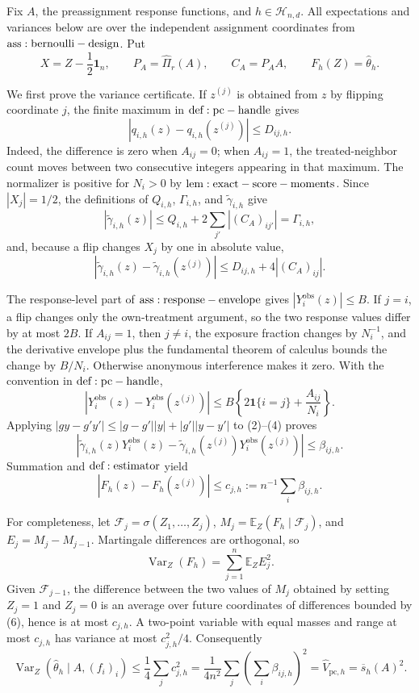 Fix \(A\), the preassignment response functions, and \(h\in\mathcal H_{n,d}\).  All expectations and variances below are over the independent assignment coordinates from \({\rm ass:bernoulli-design}\).  Put
\[
 X=Z-\frac12\mathbf1_n,\qquad P_A=\widehat\Pi_r(A),\qquad C_A=P_AA,
 \qquad F_h(Z)=\widehat\theta_h.
\]

We first prove the variance certificate.  If \(z^{(j)}\) is obtained from \(z\) by flipping coordinate \(j\), the finite maximum in \({\rm def:pc-handle}\) gives
\[
 |q_{i,h}(z)-q_{i,h}(z^{(j)})|\leq D_{ij,h}.
\tag{1}
\]
Indeed, the difference is zero when \(A_{ij}=0\); when \(A_{ij}=1\), the treated-neighbor count moves between two consecutive integers appearing in that maximum.  The normalizer is positive for \(N_i>0\) by \({\rm lem:exact-score-moments}\).  Since \(|X_j|=1/2\), the definitions of \(Q_{i,h}\), \(\Gamma_{i,h}\), and \(\widetilde\gamma_{i,h}\) give
\[
 |\widetilde\gamma_{i,h}(z)|\leq Q_{i,h}+2\sum_{j'}|(C_A)_{ij'}|=\Gamma_{i,h},
\tag{2}
\]
and, because a flip changes \(X_j\) by one in absolute value,
\[
 |\widetilde\gamma_{i,h}(z)-\widetilde\gamma_{i,h}(z^{(j)})|
 \leq D_{ij,h}+4|(C_A)_{ij}|.
\tag{3}
\]

The response-level part of \({\rm ass:response-envelope}\) gives \(|Y_i^{\mathrm{obs}}(z)|\leq B\).  If \(j=i\), a flip changes only the own-treatment argument, so the two response values differ by at most \(2B\).  If \(A_{ij}=1\), then \(j\ne i\), the exposure fraction changes by \(N_i^{-1}\), and the derivative envelope plus the fundamental theorem of calculus bounds the change by \(B/N_i\).  Otherwise anonymous interference makes it zero.  With the convention in \({\rm def:pc-handle}\),
\[
 |Y_i^{\mathrm{obs}}(z)-Y_i^{\mathrm{obs}}(z^{(j)})|
 \leq B\left\{2\mathbf1\{i=j\}+\frac{A_{ij}}{N_i}\right\}.
\tag{4}
\]
Applying \(|gy-g'y'|\leq|g-g'||y|+|g'||y-y'|\) to (2)--(4) proves
\[
 |\widetilde\gamma_{i,h}(z)Y_i^{\mathrm{obs}}(z)
 -\widetilde\gamma_{i,h}(z^{(j)})Y_i^{\mathrm{obs}}(z^{(j)})|
 \leq\beta_{ij,h}.
\tag{5}
\]
Summation and \({\rm def:estimator}\) yield
\[
 |F_h(z)-F_h(z^{(j)})|
 \leq c_{j,h}:=n^{-1}\sum_i\beta_{ij,h}.
\tag{6}
\]

For completeness, let \(\mathcal F_j=\sigma(Z_1,\ldots,Z_j)\), \(M_j=\mathbb E_Z(F_h\mid\mathcal F_j)\), and \(E_j=M_j-M_{j-1}\).  Martingale differences are orthogonal, so
\[
 \operatorname{Var}_Z(F_h)=\sum_{j=1}^n\mathbb E_ZE_j^2.
\tag{7}
\]
Given \(\mathcal F_{j-1}\), the difference between the two values of \(M_j\) obtained by setting \(Z_j=1\) and \(Z_j=0\) is an average over future coordinates of differences bounded by (6), hence is at most \(c_{j,h}\).  A two-point variable with equal masses and range at most \(c_{j,h}\) has variance at most \(c_{j,h}^2/4\).  Consequently
\[
 \operatorname{Var}_Z(\widehat\theta_h\mid A,(f_i)_i)
 \leq\frac14\sum_jc_{j,h}^2
 =\frac1{4n^2}\sum_j\left(\sum_i\beta_{ij,h}\right)^2
 =\widehat V_{\mathrm{pc},h}=\overline s_h(A)^2.
\tag{8}
\]

